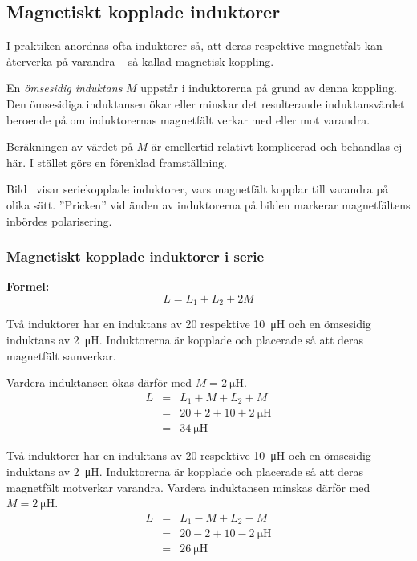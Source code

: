 \subsection{Magnetiskt kopplade induktorer}


I praktiken anordnas ofta induktorer så, att deras respektive magnetfält kan
återverka på varandra -- så kallad magnetisk koppling.

En \emph{ömsesidig induktans} \(M\) uppstår i induktorerna på grund av denna
koppling.
Den ömsesidiga induktansen ökar eller minskar det resulterande induktansvärdet
beroende på om induktorernas magnetfält verkar med eller mot varandra.

Beräkningen av värdet på \(M\) är emellertid relativt komplicerad och behandlas
ej här.
I stället görs en förenklad framställning.

Bild~ visar seriekopplade induktorer, vars magnetfält
kopplar till varandra på olika sätt.
''Pricken'' vid änden av induktorerna på bilden markerar magnetfältens inbördes
polarisering.

\subsubsection{Magnetiskt kopplade induktorer i serie}

\textbf{Formel:}
%
\[L = L_1 +L_2 \pm 2M\]
%
\begin{exempelbox}
Två induktorer har en induktans av 20 respektive \qty{10}{\micro\henry} och en
ömsesidig induktans av \qty{2}{\micro\henry}.
Induktorerna är kopplade och placerade så att deras magnetfält samverkar.

Vardera induktansen ökas därför med \(M = \qty{2}{\micro\henry}\).
\[
\begin{array}{rcl}
  L &=& L_1 + M + L_2 + M \\
    &=& 20 + 2 + 10 + \qty{2}{\micro\henry} \\
    &=& \qty{34}{\micro\henry}
\end{array}
\]
\end{exempelbox}

\begin{exempelbox}
Två induktorer har en induktans av 20 respektive \qty{10}{\micro\henry} och en
ömsesidig induktans av \qty{2}{\micro\henry}.
Induktorerna är kopplade och placerade så att deras magnetfält motverkar varandra.
Vardera induktansen minskas därför med \(M = \qty{2}{\micro\henry}\).
\[
\begin{array}{rcl}
  L &=& L_1 - M + L_2 - M \\
    &=& 20 - 2 + 10 - \qty{2}{\micro\henry} \\
    &=& \qty{26}{\micro\henry}
\end{array}
\]
\end{exempelbox}

